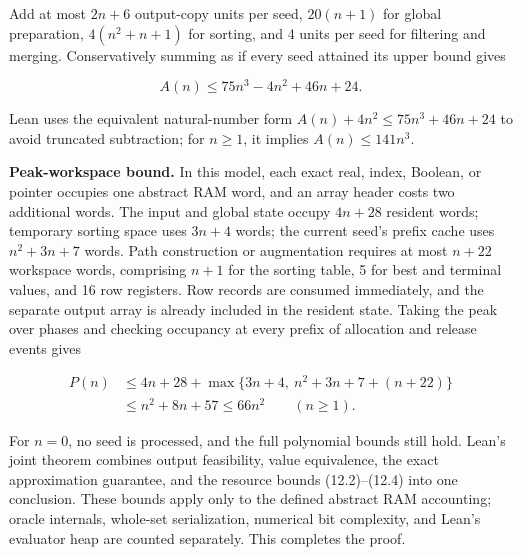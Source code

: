 \documentclass[11pt,a4paper]{article}
\begin{document}
Add at most $2n+6$ output-copy units per seed, $20(n+1)$ for global preparation, $4(n^2+n+1)$ for sorting, and 4 units per seed for filtering and merging. Conservatively summing as if every seed attained its upper bound gives

\begin{equation}
\boxed{A(n)\le75n^3-4n^2+46n+24.}
\tag{12.3}
\end{equation}

Lean uses the equivalent natural-number form $A(n)+4n^2\le75n^3+46n+24$ to avoid truncated subtraction; for $n\ge1$, it implies $A(n)\le141n^3$.

\textbf{Peak-workspace bound.} In this model, each exact real, index, Boolean, or pointer occupies one abstract RAM word, and an array header costs two additional words. The input and global state occupy $4n+28$ resident words; temporary sorting space uses $3n+4$ words; the current seed's prefix cache uses $n^2+3n+7$ words. Path construction or augmentation requires at most $n+22$ workspace words, comprising $n+1$ for the sorting table, 5 for best and terminal values, and 16 row registers. Row records are consumed immediately, and the separate output array is already included in the resident state. Taking the peak over phases and checking occupancy at every prefix of allocation and release events gives

\begin{equation}
\begin{aligned}
P(n)&\le4n+28+\max\{3n+4,\ n^2+3n+7+(n+22)\}\\
&\le\boxed{n^2+8n+57}\le66n^2\qquad(n\ge1).
\end{aligned}
\tag{12.4}
\end{equation}

For $n=0$, no seed is processed, and the full polynomial bounds still hold. Lean's joint theorem combines output feasibility, value equivalence, the exact approximation guarantee, and the resource bounds (12.2)--(12.4) into one conclusion. These bounds apply only to the defined abstract RAM accounting; oracle internals, whole-set serialization, numerical bit complexity, and Lean's evaluator heap are counted separately. This completes the proof.




\end{document}
